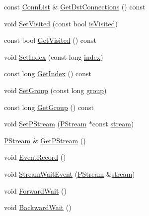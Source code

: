\begin{DoxyCompactItemize}
\item 
const \hyperlink{classfractal_1_1Layer_a112ea548588704c0915a32aa3269b5a6}{Conn\+List} \& \hyperlink{classfractal_1_1Layer_a6ca77ba55f272bd0dc70ad4787c8925a}{Get\+Dst\+Connections} () const 
\item 
void \hyperlink{classfractal_1_1Layer_abe9143e5f9015b11b2b189cff34f19c1}{Set\+Visited} (const bool \hyperlink{classfractal_1_1Layer_a4c2ad17160182ca22905e7439138a93e}{is\+Visited})
\item 
const bool \hyperlink{classfractal_1_1Layer_a2306748e27c9a06e8b30b66e8ad73b05}{Get\+Visited} () const 
\item 
void \hyperlink{classfractal_1_1Layer_a21bda82f81853060af6b2b9482fae28f}{Set\+Index} (const long \hyperlink{classfractal_1_1Layer_ad144193dca351470ca700e0efcead8a2}{index})
\item 
const long \hyperlink{classfractal_1_1Layer_a0417ae6bb056b22b11028d2d3999b710}{Get\+Index} () const 
\item 
void \hyperlink{classfractal_1_1Layer_a28468f7fe1c049a6575a97dd4b2b567a}{Set\+Group} (const long \hyperlink{classfractal_1_1Layer_a10d561417d3701d22b3a0e87178f1dcb}{group})
\item 
const long \hyperlink{classfractal_1_1Layer_a540bed9ed5f273403b4ed3131b4da72d}{Get\+Group} () const 
\item 
void \hyperlink{classfractal_1_1Layer_a41741a12021eb7b3e700c1e5e7938ccb}{Set\+P\+Stream} (\hyperlink{classfractal_1_1PStream}{P\+Stream} $\ast$const \hyperlink{classfractal_1_1Layer_aef36108269bffa0d3ecbd67f190362fa}{stream})
\item 
\hyperlink{classfractal_1_1PStream}{P\+Stream} \& \hyperlink{classfractal_1_1Layer_a55796962120c83e2c69aaa982921f8aa}{Get\+P\+Stream} ()
\item 
void \hyperlink{classfractal_1_1Layer_af559422de96bff34f588f55fbf7be1ef}{Event\+Record} ()
\item 
void \hyperlink{classfractal_1_1Layer_a9d4506c25955a82e09f0c35d43e953d6}{Stream\+Wait\+Event} (\hyperlink{classfractal_1_1PStream}{P\+Stream} \&\hyperlink{classfractal_1_1Layer_aef36108269bffa0d3ecbd67f190362fa}{stream})
\item 
void \hyperlink{classfractal_1_1Layer_aebbc3e3f785b1761b50aa4d4607629e5}{Forward\+Wait} ()
\item 
void \hyperlink{classfractal_1_1Layer_aac82571573071128dbfcb4cbca2ae4d4}{Backward\+Wait} ()
\end{DoxyCompactItemize}
